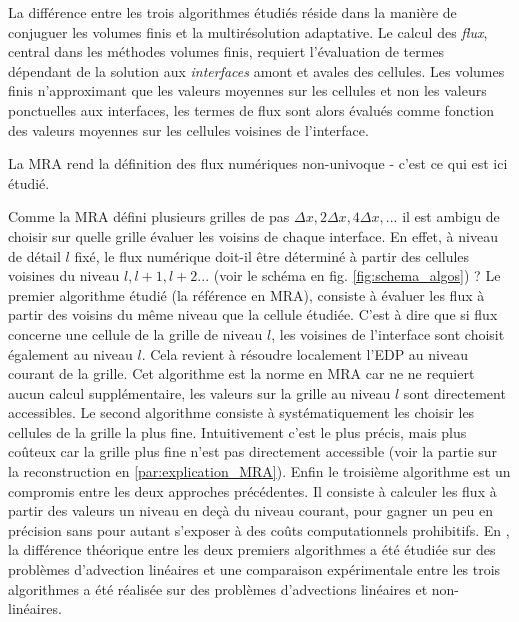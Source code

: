 La différence entre les trois algorithmes étudiés réside dans la manière de conjuguer les volumes finis \cite{LeVeque1990} et la multirésolution adaptative.
Le calcul des \textit{flux}, central dans les méthodes volumes finis, 
requiert l'évaluation de termes dépendant de la solution aux \textit{interfaces} amont et avales des cellules.
Les volumes finis n'approximant que les valeurs moyennes sur les cellules et non les valeurs ponctuelles aux interfaces, 
les termes de flux sont alors évalués comme fonction des valeurs moyennes sur les cellules voisines de l'interface.\par
La MRA rend la définition des flux numériques non-univoque - c'est ce qui est ici étudié.\par 
Comme la MRA défini plusieurs grilles de pas $\Delta x,2 \Delta x, 4 \Delta x,...$ il est ambigu de choisir sur quelle grille évaluer les voisins de chaque interface.
En effet, à niveau de détail $l$ fixé, le flux numérique doit-il être déterminé à partir des cellules voisines du niveau $l,l+1,l+2...$ (voir le schéma en fig. \ref{fig:schema_algos}) ? 
Le premier algorithme étudié (la référence en MRA), consiste à évaluer les flux à partir des voisins du même niveau que la cellule étudiée. C'est à dire que 
si flux concerne une cellule de la grille de niveau $l$, les voisines de l'interface sont choisit également au niveau $l$. Cela revient à résoudre localement l'EDP au niveau courant de la grille.
Cet algorithme est la norme en MRA car ne ne requiert aucun calcul supplémentaire, les valeurs sur la grille au niveau $l$ sont directement accessibles.
Le second algorithme consiste à systématiquement les choisir les cellules de la grille la plus fine. Intuitivement c'est le plus précis, mais plus coûteux car 
la grille plus fine n'est pas directement accessible (voir la partie sur la reconstruction en \ref{par:explication_MRA}). 
Enfin le troisième algorithme est un compromis entre les deux approches précédentes. Il consiste à calculer les flux à partir des valeurs un niveau en deçà du niveau courant, 
pour gagner un peu en précision sans pour autant s'exposer à des coûts computationnels prohibitifs.
En \cite{belloti_et_al_2025}, la différence théorique entre les deux premiers algorithmes a été étudiée sur des problèmes d'advection linéaires et
une comparaison expérimentale entre les trois algorithmes a été réalisée sur des problèmes d'advections linéaires et non-linéaires.
